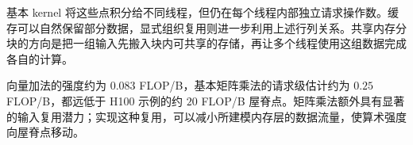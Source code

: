 基本 kernel 将这些点积分给不同线程，但仍在每个线程内部独立请求操作数。缓存可以自然保留部分数据，显式组织复用则进一步利用上述行列关系。共享内存分块的方向是把一组输入先搬入块内可共享的存储，再让多个线程使用这组数据完成各自的计算。

\begin{keybox}[title={两类例子指向的性能结论}]
向量加法的强度约为 $0.083$ FLOP/B，基本矩阵乘法的请求级估计约为 $0.25$ FLOP/B，都远低于 H100 示例的约 $20$ FLOP/B 屋脊点。矩阵乘法额外具有显著的输入复用潜力；实现这种复用，可以减小所建模内存层的数据流量，使算术强度向屋脊点移动。
\end{keybox}
